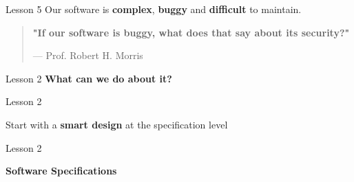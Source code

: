 \documentclass[aspectratio=1610]{beamer}
\begin{document}
\begin{frame}
\end{frame}


\begin{frame}{Lesson 5}{}
\Huge
 Our software is \textbf{complex}, \textbf{buggy} and \textbf{difficult} to maintain.
 \end{frame}


\begin{frame}
\begin{center}
\Huge
\begin{quote}
\textbf{"If our software is buggy, what does
that say about its security?"}
\begin{flushright}
{--- Prof. Robert H. Morris}
\end{flushright}
\end{quote}
\end{center}
\end{frame}


\begin{frame}
\end{frame}

\begin{frame}
\end{frame}

\begin{frame}
\end{frame}

\begin{frame}{Lesson 2}{}
\Huge
\center
    \textbf{What can we do about it?} 
\end{frame}



\begin{frame}{Lesson 2}{}
\Huge
\begin{center}
   Start with a \textbf{smart design} at the specification level
\end{center}
\end{frame}


\begin{frame}{Lesson 2}{}
\begin{center}
\Huge\textbf{Software Specifications}
\end{center}
\end{frame}
\end{document}
